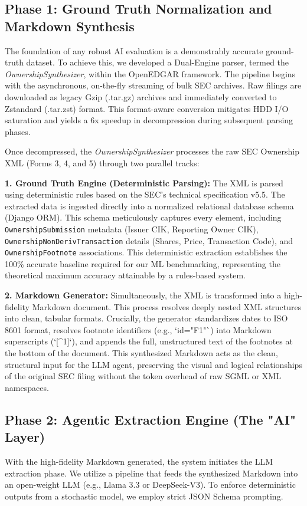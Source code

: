 \documentclass[journal, onecolumn]{IEEEtran}
\begin{document}
\subsection{Phase 1: Ground Truth Normalization and Markdown Synthesis}
The foundation of any robust AI evaluation is a demonstrably accurate ground-truth dataset. To achieve this, we developed a Dual-Engine parser, termed the \textit{OwnershipSynthesizer}, within the OpenEDGAR framework. The pipeline begins with the asynchronous, on-the-fly streaming of bulk SEC archives. Raw filings are downloaded as legacy Gzip (.tar.gz) archives and immediately converted to Zstandard (.tar.zst) format. This format-aware conversion mitigates HDD I/O saturation and yields a 6x speedup in decompression during subsequent parsing phases.

Once decompressed, the \textit{OwnershipSynthesizer} processes the raw SEC Ownership XML (Forms 3, 4, and 5) through two parallel tracks:

\textbf{1. Ground Truth Engine (Deterministic Parsing):}
The XML is parsed using deterministic rules based on the SEC's technical specification v5.5. The extracted data is ingested directly into a normalized relational database schema (Django ORM). This schema meticulously captures every element, including \texttt{OwnershipSubmission} metadata (Issuer CIK, Reporting Owner CIK), \texttt{OwnershipNonDerivTransaction} details (Shares, Price, Transaction Code), and \texttt{OwnershipFootnote} associations. This deterministic extraction establishes the 100\% accurate baseline required for our ML benchmarking, representing the theoretical maximum accuracy attainable by a rules-based system.

\textbf{2. Markdown Generator:}
Simultaneously, the XML is transformed into a high-fidelity Markdown document. This process resolves deeply nested XML structures into clean, tabular formats. Crucially, the generator standardizes dates to ISO 8601 format, resolves footnote identifiers (e.g., `id="F1"`) into Markdown superscripts (`[^{1}]`), and appends the full, unstructured text of the footnotes at the bottom of the document. This synthesized Markdown acts as the clean, structural input for the LLM agent, preserving the visual and logical relationships of the original SEC filing without the token overhead of raw SGML or XML namespaces.

\subsection{Phase 2: Agentic Extraction Engine (The "AI" Layer)}
With the high-fidelity Markdown generated, the system initiates the LLM extraction phase. We utilize a pipeline that feeds the synthesized Markdown into an open-weight LLM (e.g., Llama 3.3 or DeepSeek-V3). To enforce deterministic outputs from a stochastic model, we employ strict JSON Schema prompting.
\end{document}
